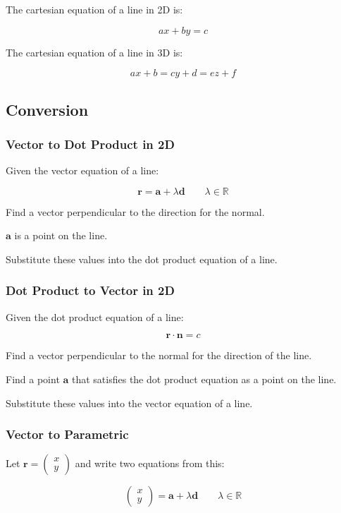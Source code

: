 \documentclass[a4paper,11pt]{article}
\newcommand{\bb}{\boldsymbol}
\begin{document}
The cartesian equation of a line in 2D is:

$$
ax + by = c
$$

The cartesian equation of a line in 3D is:

$$
ax + b = cy + d = ez + f
$$


\subsection{Conversion}

\subsubsection{Vector to Dot Product in 2D}

Given the vector equation of a line:

$$
\bb{r} = \bb{a} + \lambda \bb{d} \qquad \lambda \in \mathbb{R}
$$

Find a vector perpendicular to the direction for the normal.

$\bb{a}$ is a point on the line.

Substitute these values into the dot product equation of a line.


\subsubsection{Dot Product to Vector in 2D}

Given the dot product equation of a line:

$$
\bb{r} \cdot \bb{n} = c
$$

Find a vector perpendicular to the normal for the direction of the line.

Find a point $\bb{a}$ that satisfies the dot product equation as a point on the
line.

Substitute these values into the vector equation of a line.


\subsubsection{Vector to Parametric}

Let $\bb{r} = \begin{pmatrix} x \\ y \end{pmatrix}$ and write two equations
from this:

$$
\begin{pmatrix} x \\ y \end{pmatrix} = \bb{a} + \lambda \bb{d} \qquad \lambda \in \mathbb{R}
$$
\end{document}
